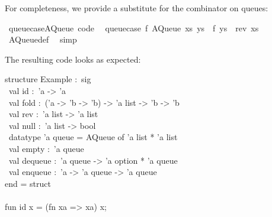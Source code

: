 \begin{isabellebody}
\begin{isamarkuptext}
\noindent For completeness, we provide a substitute for the
   combinator on queues:%
\end{isamarkuptext}%
\isamarkuptrue%
%
\isadelimquote
%
\endisadelimquote
%
\isatagquote
{}\isamarkupfalse%
\ queue{\isacharunderscore}case{\isacharunderscore}AQueue\ {\isacharbrackleft}code{\isacharbrackright}{\isacharcolon}\isanewline
\ \ {\isachardoublequoteopen}queue{\isacharunderscore}case\ f\ {\isacharparenleft}AQueue\ xs\ ys{\isacharparenright}\ {\isacharequal}\ f\ {\isacharparenleft}ys\ {\isacharat}\ rev\ xs{\isacharparenright}{\isachardoublequoteclose}\isanewline
\ \ \isamarkupfalse%
\ AQueue{\isacharunderscore}def\ \isamarkupfalse%
\ simp%
\endisatagquote
{\isafoldquote}%
%
\isadelimquote
%
\endisadelimquote
%
\begin{isamarkuptext}%
\noindent The resulting code looks as expected:%
\end{isamarkuptext}%
\isamarkuptrue%
%
\isadelimquote
%
\endisadelimquote
%
\isatagquote
%
\begin{isamarkuptext}%
\isatypewriter%
\noindent%
\hspace*{0pt}structure Example :~sig\\
\hspace*{0pt} ~val id :~'a -> 'a\\
\hspace*{0pt} ~val fold :~('a -> 'b -> 'b) -> 'a list -> 'b -> 'b\\
\hspace*{0pt} ~val rev :~'a list -> 'a list\\
\hspace*{0pt} ~val null :~'a list -> bool\\
\hspace*{0pt} ~datatype 'a queue = AQueue of 'a list * 'a list\\
\hspace*{0pt} ~val empty :~'a queue\\
\hspace*{0pt} ~val dequeue :~'a queue -> 'a option * 'a queue\\
\hspace*{0pt} ~val enqueue :~'a -> 'a queue -> 'a queue\\
\hspace*{0pt}end = struct\\
\hspace*{0pt}\\
\hspace*{0pt}fun id x = (fn xa => xa) x;\\

\end{isamarkuptext}
\end{isabellebody}
